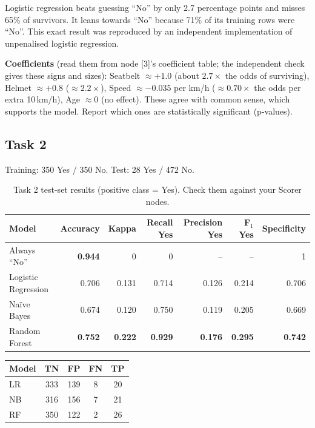 \documentclass[11pt,a4paper]{article}
\begin{document}
Logistic regression beats guessing ``No'' by only 2.7 percentage points and misses 65\% of survivors. It leans
towards ``No'' because 71\% of its training rows were ``No''. This exact result was reproduced by an independent
implementation of unpenalised logistic regression.

\textbf{Coefficients} (read them from node [3]'s coefficient table; the independent check gives these signs and sizes):
Seatbelt $\approx +1.0$ (about $2.7\times$ the odds of surviving), Helmet $\approx +0.8$ ($\approx 2.2\times$),
Speed $\approx -0.035$ per km/h ($\approx 0.70\times$ the odds per extra 10\,km/h), Age $\approx 0$ (no effect).
These agree with common sense, which supports the model. Report which ones are statistically significant
(p-values).

\subsection{Task 2}
Training: 350 Yes / 350 No. Test: 28 Yes / 472 No.

\begin{table}[H]\centering\small
\begin{tabular}{@{}lrrrrrr@{}}\toprule
Model & Accuracy & Kappa & Recall Yes & Precision Yes & F$_1$ Yes & Specificity \\ \midrule
Always ``No'' & \textbf{0.944} & 0 & 0 & -- & -- & 1 \\
Logistic Regression & 0.706 & 0.131 & 0.714 & 0.126 & 0.214 & 0.706 \\
Naïve Bayes & 0.674 & 0.120 & 0.750 & 0.119 & 0.205 & 0.669 \\
Random Forest & \textbf{0.752} & \textbf{0.222} & \textbf{0.929} & \textbf{0.176} & \textbf{0.295} & \textbf{0.742} \\ \bottomrule
\end{tabular}
\caption{Task 2 test-set results (positive class = Yes). Check them against your Scorer nodes.}
\end{table}

\begin{center}\small
\begin{tabular}{@{}lcccc@{}}\toprule
Model & TN & FP & FN & TP \\ \midrule
LR & 333 & 139 & 8 & 20 \\ NB & 316 & 156 & 7 & 21 \\ RF & 350 & 122 & 2 & 26 \\ \bottomrule
\end{tabular}
\end{center}
\end{document}
